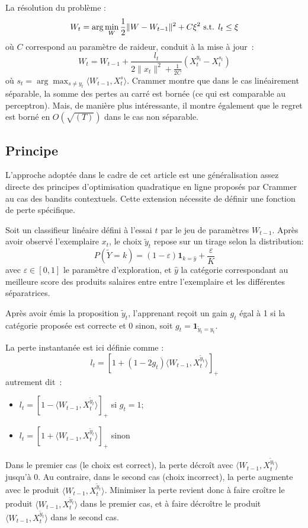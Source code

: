 \documentclass[preprint,12pt,authoryear]{elsarticle}
\begin{document}
La résolution du problème :
$$W_{t} = \arg \min_W \frac{1}{2} \| W - W_{t-1}\|^2 + C \xi^2 \hbox{ s.t. } l_t \leq \xi$$
où $C$ correspond au paramètre de raideur, conduit à la mise à jour~:
$$W_{t} =  W_{t-1} + \frac{l_t}{2\|x_t\|^2 + \frac{1}{2C}} (X_t^{y_t} - X_t^{s_t})$$
où $s_t = \arg\max_{s \neq y_t} \langle W_{t-1}, X_t^s \rangle$. Crammer montre que dans le cas linéairement séparable, la somme des pertes au carré est bornée (ce qui est comparable au perceptron). Mais, de manière plus intéressante, il montre également que le regret est  borné en $O(\sqrt{(T)})$ dans le cas non séparable.

  


\subsection{Principe}
L'approche adoptée dans le cadre de cet article est une généralisation assez directe des principes d'optimisation quadratique en ligne proposés par Crammer au cas des bandits contextuels. Cette extension nécessite de définir une fonction de perte spécifique. 

Soit un classifieur linéaire défini à l'essai $t$ par le jeu de paramètres $W_{t-1}$. Après avoir observé l'exemplaire $x_t$, le choix $\tilde{y}_t$ repose sur un tirage selon la distribution: $$P(\tilde{Y}=k) = (1 - \varepsilon) \mathbf{1}_{k = \hat{y}} + \frac{\varepsilon}{K} $$ avec $\varepsilon \in [0,1]$ le paramètre d'exploration, et $\hat{y}$ la catégorie correspondant au meilleure score des produits salaires entre entre l'exemplaire et les différentes séparatrices.  

Après avoir émis la proposition $\tilde{y}_t$, l'apprenant reçoit un gain $g_t$ égal à 1 si la catégorie proposée est correcte et 0 sinon, soit $g_t = \mathbf{1}_{\tilde{y}_t=y_t}$. 

La perte instantanée est ici définie comme :
$$l_t = [1 + (1 - 2 g_t) \langle W_{t-1}, X_t^{\tilde{y}_t}\rangle]_+$$
autrement dit~:
\begin{itemize}
	\item[] $l_t = [1 - \langle W_{t-1}, X_t^{\tilde{y}_t}\rangle]_+$ si $g_t=1$;
	\item[] $l_t = [1 + \langle W_{t-1}, X_t^{\tilde{y}_t}\rangle]_+$ sinon
\end{itemize}
Dans le premier cas (le choix est correct), la perte décroît avec $\langle W_{t-1}, X_t^{\tilde{y}_t}\rangle$ jusqu'à 0. Au contraire, dans le second cas (choix incorrect), la perte augmente avec le produit $\langle W_{t-1}, X_t^{\tilde{y}_t}\rangle$.
Minimiser la perte revient donc à faire croître le produit $\langle W_{t-1}, X_t^{\tilde{y}_t}\rangle$ dans le premier cas, et à faire décroître le produit $\langle W_{t-1}, X_t^{\tilde{y}_t}\rangle$  dans le second cas.
\end{document}
